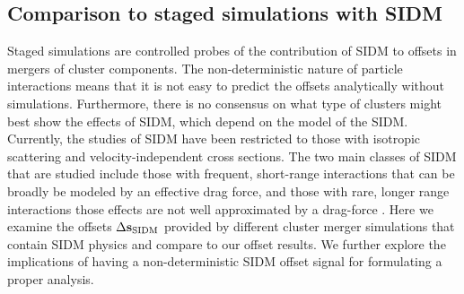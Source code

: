 \subsection{Comparison to staged simulations with SIDM}
\label{subsec:SIDM_sim}
Staged simulations are controlled probes of the contribution
of SIDM to offsets in mergers of cluster components. 
The non-deterministic nature of particle interactions means that it is not easy
to predict the offsets analytically without simulations.
Furthermore, there is no consensus on what type of clusters might best show the
effects of SIDM, which depend on the model of the SIDM.
Currently, the studies of SIDM have been restricted to those with isotropic
scattering and velocity-independent cross sections.   
The two main classes of SIDM that are studied include those with 
frequent, short-range interactions that can be broadly be modeled by an
effective drag force, and those with rare, longer range interactions those
effects are not well approximated by a drag-force \citep{Kahlhoefer14}. 
Here we examine the offsets $\Delta {\bf s}_{\rm SIDM}$ provided by different cluster merger 
simulations that contain SIDM physics and compare to our offset results. 
We further explore the implications of having a non-deterministic SIDM offset signal for
formulating a proper analysis. 

